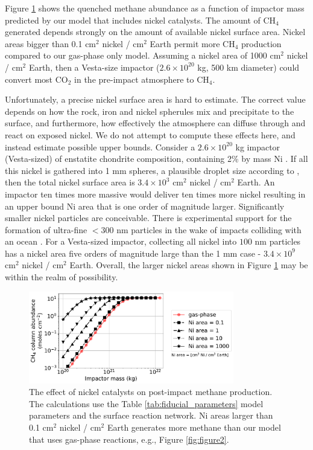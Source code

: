 Figure \ref{fig:figure3} shows the quenched methane abundance as a function of impactor mass predicted by our model that includes nickel catalysts. The amount of CH$_4$ generated depends strongly on the amount of available nickel surface area. Nickel areas bigger than 0.1 cm$^2$ nickel / cm$^2$ Earth permit more CH$_4$ production compared to our gas-phase only model. Assuming a nickel area of 1000 cm$^2$ nickel / cm$^2$ Earth, then a Vesta-size impactor ($2.6 \times 10^{20}$ kg, 500 km diameter) could convert most CO$_2$ in the pre-impact atmosphere to CH$_4$.

Unfortunately, a precise nickel surface area is hard to estimate. The correct value depends on how the rock, iron and nickel spherules mix and precipitate to the surface, and furthermore, how effectively the atmosphere can diffuse through and react on exposed nickel. We do not attempt to compute these effects here, and instead estimate possible upper bounds. Consider a $2.6 \times 10^{20}$ kg impactor (Vesta-sized) of enstatite chondrite composition, containing 2\% by mass Ni \citep{Lewis_1992}. If all this nickel is gathered into 1 mm spheres, a plausible droplet size according to \citet{Genda_2017}, then the total nickel surface area is $3.4 \times 10^3$ cm$^2$ nickel / cm$^2$ Earth. An impactor ten times more massive would deliver ten times more nickel resulting in an upper bound Ni area that is one order of magnitude larger. Significantly smaller nickel particles are conceivable. There is experimental support for the formation of ultra-fine $< 300$ nm particles in the wake of impacts colliding with an ocean \citep{Furukawa_2007}. For a Vesta-sized impactor, collecting all nickel into $100$ nm particles has a nickel area five orders of magnitude large than the 1 mm case - $3.4 \times 10^{9}$ cm$^2$ nickel / cm$^2$ Earth. Overall, the larger nickel areas shown in Figure \ref{fig:figure3} may be within the realm of possibility.

\begin{figure}
  \centering
  \includegraphics[width=0.8\textwidth]{tex/5impacts/figures/Figure3.pdf}
  \caption{The effect of nickel catalysts on post-impact methane production. The calculations use the Table \ref{tab:fiducial_parameters} model parameters and the \citet{Schmider_2021} surface reaction network. Ni areas larger than 0.1 cm$^2$ nickel / cm$^2$ Earth generates more methane than our model that uses gas-phase reactions, e.g., Figure \ref{fig:figure2}.}
  \label{fig:figure3}
\end{figure}

